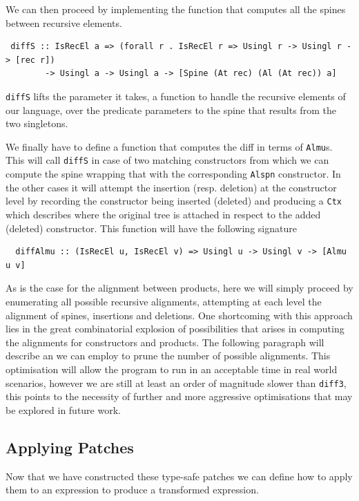 \documentclass[11pt, titlepage]{article}
\begin{document}
We can then proceed by implementing the function that computes all the spines 
between recursive elements.
\begin{verbatim}
 diffS :: IsRecEl a => (forall r . IsRecEl r => Usingl r -> Usingl r -> [rec r])
        -> Usingl a -> Usingl a -> [Spine (At rec) (Al (At rec)) a]
\end{verbatim}
\texttt{diffS} lifts the parameter it takes, a function to handle the 
recursive elements of our language, over the predicate parameters to the spine that results 
from the two singletons.

We finally have to define a function that computes the diff in terms of 
\texttt{Almu}s. This will call \texttt{diffS} in case of two matching constructors from which we can compute the spine wrapping that with the corresponding \texttt{Alspn} constructor. In the other cases it will attempt the insertion (resp. deletion) at the constructor level by recording the constructor being inserted (deleted) and producing a \texttt{Ctx} which describes where the original tree is attached in respect to the added (deleted) constructor.
This function will have the following signature

\begin{verbatim}
  diffAlmu :: (IsRecEl u, IsRecEl v) => Usingl u -> Usingl v -> [Almu u v]
\end{verbatim}

As is the case for the alignment between products, here we will simply proceed 
by enumerating all possible recursive alignments, attempting at each level 
the alignment of spines, insertions and deletions.
One shortcoming with this approach lies in the great combinatorial 
explosion of possibilities that arises in computing the alignments for 
constructors and products. The following paragraph will describe an  
we can employ to prune the number of possible alignments. This optimisation 
will allow the program to run in an acceptable time in real world scenarios, however 
we are still at least an order of magnitude slower than \texttt{diff3}, this points to 
the necessity of further and more aggressive optimisations that may be explored 
in future work.

\subsection{Applying Patches}\label{app_patches}

Now that we have constructed these type-safe patches we can define how to apply 
them to an expression to produce a transformed expression.
\end{document}
